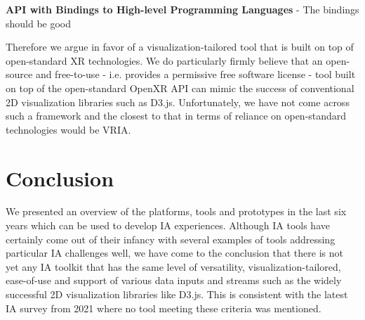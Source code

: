 \documentclass{vgtc}                          %
\begin{document}
\textbf{API with Bindings to High-level Programming Languages} - The
bindings should be good

Therefore we argue in favor of a visualization-tailored tool that is built on
top of open-standard XR technologies. We do particularly firmly believe that
an open-source and free-to-use - i.e. provides a permissive free software
license - tool built on top of the open-standard OpenXR API can mimic the
success of conventional 2D visualization libraries such as D3.js.
Unfortunately, we have not come across such a framework and the closest to that
in terms of reliance on open-standard technologies would be VRIA.

\section{Conclusion}
We presented an overview of the platforms, tools and prototypes in the last six
years which can be used to develop IA experiences. Although IA tools have
certainly come out of their infancy with several examples of tools addressing
particular IA challenges well, we have come to the conclusion that there is not
yet any IA toolkit that has the same level of versatility,
visualization-tailored, ease-of-use and support of various data inputs and
streams such as the widely successful 2D visualization libraries like D3.js.
This is consistent with the latest IA survey from 2021 \cite{survey_of_ia}
where no tool meeting these criteria was mentioned.

\printbibliography
\end{document}
